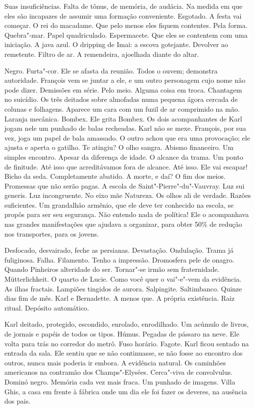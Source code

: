 Suas insuficiências. Falta de tônus, de memória, de audácia. Na medida
em que eles são incapazes de assumir uma formação conveniente. Esgotado.
A festa vai começar. O rei do macadame. Que pelo menos eles fiquem
contentes. Pela forma. Quebra"-mar. Papel quadriculado. Espermacete. Que
eles se contentem com uma iniciação. A java azul. O dripping de Imai: a
escova gotejante. Devolver ao remetente. Filtro de ar. A remendeira,
ajoelhada diante do altar.

Negro. Furta"-cor. Ele se afasta da reunião. Todos o ouvem; demonstra
autoridade. François vem se juntar a ele, e um outro personagem cujo
nome não pode dizer. Demissões em série. Pelo meio. Alguma coisa em
troca. Chantagem no suicídio. Os três deitados sobre almofadas numa
pequena ágora cercada de colunas e folhagens. Aparece um cara com um
fuzil de ar comprimido na mão. Laranja mecânica. Bombex. Ele grita
Bombex. Os dois acompanhantes de Karl jogam nele um punhado de balas
recheadas. Karl não se mexe. François, por sua vez, joga um papel de
bala amassado. O outro achou que era uma provocação; ele ajusta e aperta
o gatilho. Te atingiu? O olho sangra. Abismo financeiro. Um simples
encontro. Apesar da diferença de idade. O alcance da trama. Um ponto de
finitude. Até isso que acreditávamos fora de alcance. Até isso. Ele vai
escapar! Bicho da seda. Completamente abatido. A morte, e daí? O fim dos
meios. Promessas que não serão pagas. A escola de
Saint"-Pierre"-du"-Vauvray. Luz sui generis. Luz incongruente. No eixo mãe
Natureza. Os olhos ali de verdade. Razões suficientes. Um grandalhão
armênio, que ele deve ter conhecido na escola, se propôs para ser seu
segurança. Não entendo nada de política! Ele o acompanhava nas grandes
manifestações que ajudava a organizar, para obter 50\% de redução nos
transportes, para os jovens.

Desfocado, desvairado, feche as persianas. Devastação. Ondulação. Trama
já fuliginosa. Falha. Filamento. Tenho a impressão. Dromosfera pele de
onagro. Quando Pinheiros alteridade do ser. Tornar"-se irmão sem
fraternidade. Mütterlichkeit. O quarto de Lucie. Como você quer o
vai"-e"-vem da evidência. As ilhas fractais. Lampiões tingidos de aurora.
Salpingite. Saltimbanco. Quinze dias fim de mês. Karl e Bernadette. A
menos que. A própria existência. Raiz ritual. Depósito automático.

Karl deitado, protegido, escondido, enrolado, enrodilhado. Um acúmulo de
livros, de jornais e papéis de todos os tipos. Húmus. Pegadas de pássaro
na neve. Ele volta para trás no corredor do metrô. Fuso horário. Fagote.
Karl ficou sentado na entrada da sala. Ele sentiu que se não
continuasse, se não fosse ao encontro dos outros, nunca mais poderia ir
embora. A evidência natural. Os caminhões americanos na contramão dos
Champs"-Elysées. Cerca"-viva de convolvulus. Dominó negro. Memória cada
vez mais fraca. Um punhado de imagens. Villa Ghis, a casa em frente à
fábrica onde um dia ele foi fazer os deveres, na ausência dos pais.

